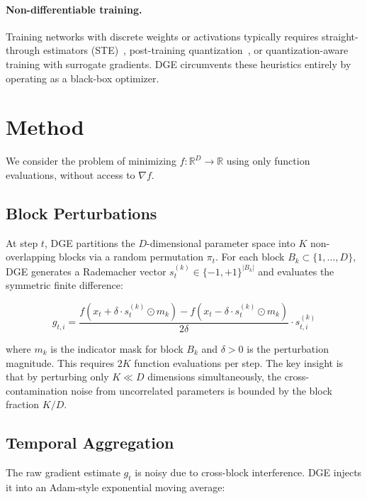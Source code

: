 \documentclass[10pt]{article}
\begin{document}
\paragraph{Non-differentiable training.}
Training networks with discrete weights or activations typically requires straight-through estimators (STE)~\citep{bengio2013estimating}, post-training quantization~\citep{banner2019post}, or quantization-aware training with surrogate gradients. DGE circumvents these heuristics entirely by operating as a black-box optimizer.

\section{Method}
\label{sec:method}

We consider the problem of minimizing $f: \mathbb{R}^D \to \mathbb{R}$ using only function evaluations, without access to $\nabla f$.

\subsection{Block Perturbations}
\label{sec:blocks}

At step $t$, DGE partitions the $D$-dimensional parameter space into $K$ non-overlapping blocks via a random permutation $\pi_t$. For each block $B_k \subset \{1, \ldots, D\}$, DGE generates a Rademacher vector $s_t^{(k)} \in \{-1, +1\}^{|B_k|}$ and evaluates the symmetric finite difference:

\begin{equation}
    g_{t,i} = \frac{f(x_t + \delta \cdot s_t^{(k)} \odot m_k) - f(x_t - \delta \cdot s_t^{(k)} \odot m_k)}{2\delta} \cdot s_{t,i}^{(k)}
    \label{eq:block_estimator}
\end{equation}

\noindent where $m_k$ is the indicator mask for block $B_k$ and $\delta > 0$ is the perturbation magnitude. This requires $2K$ function evaluations per step. The key insight is that by perturbing only $K \ll D$ dimensions simultaneously, the cross-contamination noise from uncorrelated parameters is bounded by the block fraction $K/D$.

\subsection{Temporal Aggregation}
\label{sec:ema}

The raw gradient estimate $g_t$ is noisy due to cross-block interference. DGE injects it into an Adam-style exponential moving average:
\end{document}
